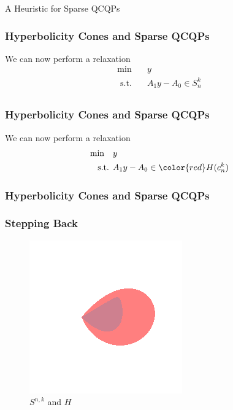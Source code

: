 \documentclass{beamer}
\newcommand{\st}{{\text{ s.t. }}}
\begin{document}
\begin{frame}
    \centering
    \huge
    {\color{gray}A Heuristic for Sparse QCQPs}
\end{frame}
\begin{frame}
    \frametitle{Hyperbolicity Cones and Sparse QCQPs}
    We can now perform a relaxation
    \begin{equation*}
        \begin{aligned}
            \min\quad & y\\
            \st & A_1y - A_0 \in S^k_n\\
        \end{aligned}
    \end{equation*}
\end{frame}
\begin{frame}
    \frametitle{Hyperbolicity Cones and Sparse QCQPs}
    We can now perform a relaxation
        \begin{equation*}
            \begin{aligned}
                \min\quad & y\\
                \st & A_1y - A_0 \in {\color{red} H(c_n^k)}\\
            \end{aligned}
        \end{equation*}
    \pause
\end{frame}
\begin{frame}
    \frametitle{Hyperbolicity Cones and Sparse QCQPs}
    \frametitle{Stepping Back}
    \begin{figure}[h]
        \centering
        \includegraphics[width=0.6\linewidth]{comparison.png}
        \caption{$S^{n,k}$ and $H$}%
        \label{fig:just_snk}
    \end{figure}
\end{frame}
\end{document}
